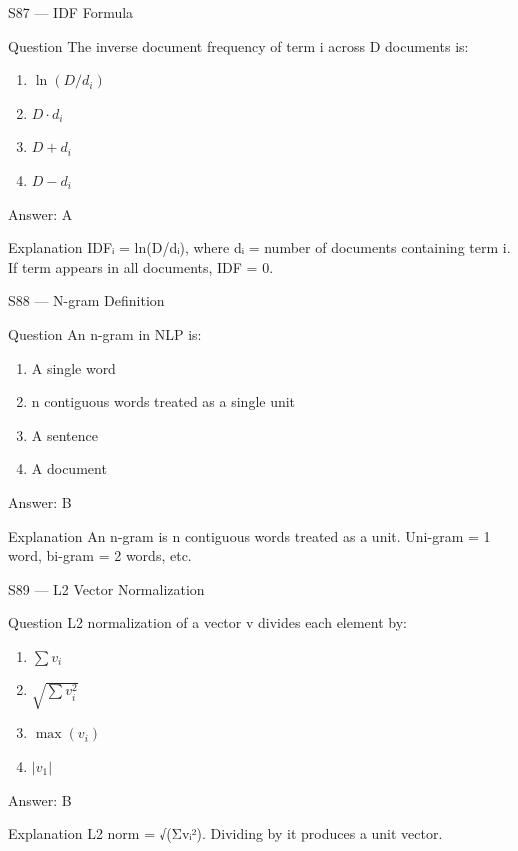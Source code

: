 \documentclass[aspectratio=169,8pt]{beamer}
\begin{document}
	\begin{frame}{S87 --- IDF Formula}
		\begin{block}{Question}
			The inverse document frequency of term i across D documents is:
			\begin{enumerate}
				\item $\ln(D/d_i)$
				\item $D \cdot d_i$
				\item $D + d_i$
				\item $D - d_i$
			\end{enumerate}
		\end{block}
		\begin{exampleblock}{Answer: A}\end{exampleblock}
		\begin{block}{Explanation}
			IDFᵢ = ln(D/dᵢ), where dᵢ = number of documents containing term i. If term appears in all documents, IDF = 0.
		\end{block}
	\end{frame}
	
	\begin{frame}{S88 --- N-gram Definition}
		\begin{block}{Question}
			An n-gram in NLP is:
			\begin{enumerate}
				\item A single word
				\item n contiguous words treated as a single unit
				\item A sentence
				\item A document
			\end{enumerate}
		\end{block}
		\begin{exampleblock}{Answer: B}\end{exampleblock}
		\begin{block}{Explanation}
			An n-gram is n contiguous words treated as a unit. Uni-gram = 1 word, bi-gram = 2 words, etc.
		\end{block}
	\end{frame}
	
	\begin{frame}{S89 --- L2 Vector Normalization}
		\begin{block}{Question}
			L2 normalization of a vector v divides each element by:
			\begin{enumerate}
				\item $\sum v_i$
				\item $\sqrt{\sum v_i^2}$
				\item $\max(v_i)$
				\item $|v_1|$
			\end{enumerate}
		\end{block}
		\begin{exampleblock}{Answer: B}\end{exampleblock}
		\begin{block}{Explanation}
			L2 norm = √(Σvᵢ²). Dividing by it produces a unit vector.
		\end{block}
	\end{frame}
	
\end{document}
